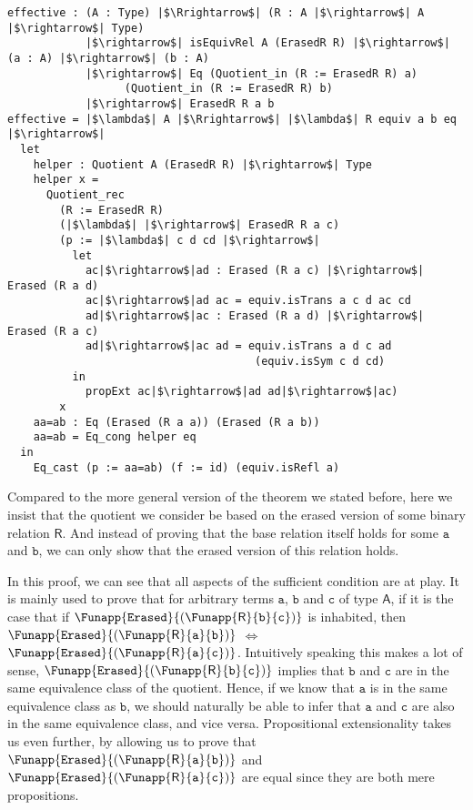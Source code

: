 \documentclass[12pt,twoside,maitrise]{dms}
\theoremstyle{definition}
\numberwithin{equation}{section}
\numberwithin{table}{chapter}
\numberwithin{figure}{chapter}
\newcommand\kw[1] {\textsf{#1}}
\newcommand\id[1] {\texttt{#1}}
\begin{document}
\begin{verbatim}
effective : (A : Type) |$\Rrightarrow$| (R : A |$\rightarrow$| A |$\rightarrow$| Type)
            |$\rightarrow$| isEquivRel A (ErasedR R) |$\rightarrow$| (a : A) |$\rightarrow$| (b : A)
            |$\rightarrow$| Eq (Quotient_in (R := ErasedR R) a)
                  (Quotient_in (R := ErasedR R) b)
            |$\rightarrow$| ErasedR R a b
effective = |$\lambda$| A |$\Rrightarrow$| |$\lambda$| R equiv a b eq |$\rightarrow$|
  let
    helper : Quotient A (ErasedR R) |$\rightarrow$| Type
    helper x =
      Quotient_rec
        (R := ErasedR R)
        (|$\lambda$| |$\rightarrow$| ErasedR R a c)
        (p := |$\lambda$| c d cd |$\rightarrow$|
          let
            ac|$\rightarrow$|ad : Erased (R a c) |$\rightarrow$| Erased (R a d)
            ac|$\rightarrow$|ad ac = equiv.isTrans a c d ac cd
            ad|$\rightarrow$|ac : Erased (R a d) |$\rightarrow$| Erased (R a c)
            ad|$\rightarrow$|ac ad = equiv.isTrans a d c ad
                                      (equiv.isSym c d cd)
          in
            propExt ac|$\rightarrow$|ad ad|$\rightarrow$|ac)
        x
    aa=ab : Eq (Erased (R a a)) (Erased (R a b))
    aa=ab = Eq_cong helper eq
  in
    Eq_cast (p := aa=ab) (f := id) (equiv.isRefl a)
\end{verbatim}

Compared to the more general version of the theorem we stated before, here we
insist that the quotient we consider be based on the erased version of some
binary relation $\kw{R}$. And instead of proving that the base relation itself
holds for some $\id{a}$ and $\id{b}$, we can only show that the erased version
of this relation holds.

In this proof, we can see that all aspects of the sufficient condition are at
play. It is mainly used to prove that for arbitrary terms $\id{a}$, $\id{b}$ and
$\id{c}$ of type $\kw{A}$, if it is the case that if
$\Funapp{\id{Erased}}{(\Funapp{\kw{R}}{\id{b}}{\id{c}})}$ is inhabited, then
$\Funapp{\id{Erased}}{(\Funapp{\kw{R}}{\id{a}}{\id{b}})}$ $\iff$
$\Funapp{\id{Erased}}{(\Funapp{\kw{R}}{\id{a}}{\id{c}})}$. Intuitively speaking
this makes a lot of sense,
$\Funapp{\id{Erased}}{(\Funapp{\kw{R}}{\id{b}}{\id{c}})}$ implies that $\id{b}$
and $\id{c}$ are in the same equivalence class of the quotient. Hence, if we
know that $\id{a}$ is in the same equivalence class as $\id{b}$, we should
naturally be able to infer that $\id{a}$ and $\id{c}$ are also in the same
equivalence class, and vice versa. Propositional extensionality takes us even
further, by allowing us to prove that
$\Funapp{\id{Erased}}{(\Funapp{\kw{R}}{\id{a}}{\id{b}})}$ and
$\Funapp{\id{Erased}}{(\Funapp{\kw{R}}{\id{a}}{\id{c}})}$ are equal since they
are both mere propositions.
\end{document}
